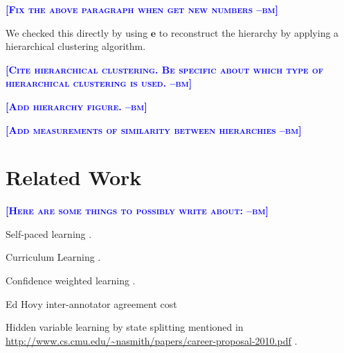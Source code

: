 \documentclass{article} %
\newcommand{\bmcomment}[1]{\textcolor{blue}{\textsc{\textbf{[#1 --bm]}}}}
\begin{document}
\bmcomment{Fix the above paragraph when get new numbers}

We checked this directly by using $\mathbf{e}$ to reconstruct the
hierarchy by applying a hierarchical clustering algorithm. 

\bmcomment{Cite hierarchical clustering.  Be specific about which
type of hierarchical clustering is used.}

\bmcomment{Add hierarchy figure.}


\bmcomment{Add measurements of similarity between hierarchies}


%
% 
% 


\section{Related Work}



\bmcomment{Here are some things to possibly write about:}

Self-paced learning \citep{kumar2010self}.

Curriculum Learning \citep{bengio2009curriculum}.

Confidence weighted learning \citep{dredze2008confidence}.

Ed Hovy inter-annotator agreement cost \citep{plank2014learning}

Hidden variable learning by state splitting mentioned in 
\url{http://www.cs.cmu.edu/~nasmith/papers/career-proposal-2010.pdf} 
\citep{petrov2011coarse}.
\end{document}
